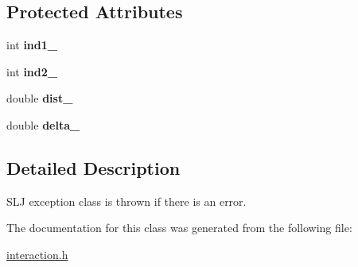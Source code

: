 \subsection*{Protected Attributes}
\begin{DoxyCompactItemize}
\item 
\hypertarget{classSljException_aa5ae091f4f5cc401ecdb838b6f4e3be9}{int {\bfseries ind1\-\_\-}}\label{classSljException_aa5ae091f4f5cc401ecdb838b6f4e3be9}

\item 
\hypertarget{classSljException_af37b08ff37b7c1e43e4e80342766e41e}{int {\bfseries ind2\-\_\-}}\label{classSljException_af37b08ff37b7c1e43e4e80342766e41e}

\item 
\hypertarget{classSljException_aeb9853dfd402e4541b50415915fabe50}{double {\bfseries dist\-\_\-}}\label{classSljException_aeb9853dfd402e4541b50415915fabe50}

\item 
\hypertarget{classSljException_a02625514011528a6f3f7516d2af33035}{double {\bfseries delta\-\_\-}}\label{classSljException_a02625514011528a6f3f7516d2af33035}

\end{DoxyCompactItemize}


\subsection{Detailed Description}
S\-L\-J exception class is thrown if there is an error. 

The documentation for this class was generated from the following file\-:\begin{DoxyCompactItemize}
\item 
\hyperlink{interaction_8h}{interaction.\-h}\end{DoxyCompactItemize}
